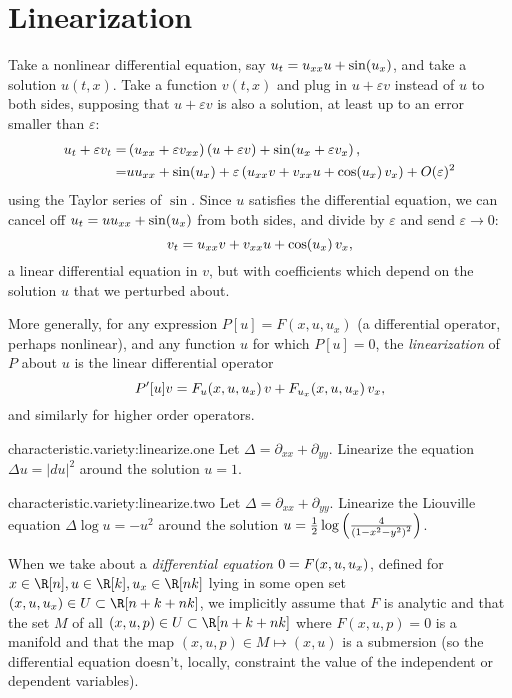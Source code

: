 \section{Linearization}
\begin{example}
Take a nonlinear differential equation, say \(u_t=u_{xx} u + \sin\!\left(u_x\right)\), and take a solution \(u(t,x)\).
Take a function \(v(t,x)\) and plug in \(u+\varepsilon v\) instead of \(u\) to both sides, supposing that \(u+\varepsilon v\) is also a solution, at least up to an error smaller than \(\varepsilon\):
\begin{align*}
u_t+\varepsilon v_t 
=& 
\left(u_{xx} + \varepsilon v_{xx}\right)(u+\varepsilon v) + \sin\!\left(u_x + \varepsilon v_x\right),
\\
=& 
u u_{xx} + \sin\!\left(u_x\right) + \varepsilon\left(u_{xx} v + v_{xx} u + \cos\!\left(u_x\right) v_x\right) + O(\varepsilon)^2
\end{align*}
using the Taylor series of \(\sin\).
Since \(u\) satisfies the differential equation, we can cancel off \(u_t=u u_{xx} + \sin\!\left(u_x\right)\) from both sides, and divide by \(\varepsilon\) and send \(\varepsilon \to 0\):
\[
v_t = u_{xx} v + v_{xx} u + \cos\!\left(u_x\right) v_x,
\]
a linear differential equation in \(v\), but with coefficients which depend on the solution \(u\) that we perturbed about.
\end{example}
More generally, for any expression \(P[u]=F(x,u,u_x)\) (a differential operator, perhaps nonlinear), and any function \(u\) for which \(P[u]=0\), the \emph{linearization} of \(P\) about \(u\) is the linear differential operator
\[
P'[u]v = F_u\!\left(x,u,u_x\right) v + F_{u_x}\!\left(x,u,u_x\right) v_x,
\]
and similarly for higher order operators.
\begin{problem}{characteristic.variety:linearize.one}
Let \(\Delta=\partial_{xx} + \partial_{yy}\).
Linearize the equation \(\Delta u=|du|^2\) around the solution \(u=1\).
\end{problem}
\begin{problem}{characteristic.variety:linearize.two}
Let \(\Delta=\partial_{xx} + \partial_{yy}\).
Linearize the Liouville equation \(\Delta \log u=-u^2\) around the solution \(u=\frac{1}{2}\log\left(\frac{4}{\left(1-x^2-y^2\right)^2}\right)\).
\end{problem}
When we take about a \emph{differential equation} \(0=F\!\left(x,u,u_x\right)\), defined for \(x \in \R[n], u \in \R[k], u_x \in \R[nk]\) lying in some open set \(\pr{x,u,u_x} \in U \subset \R[n+k+nk]\), we implicitly assume that \(F\) is analytic and that the set \(M\) of all \((x,u,p) \in U \subset \R[n+k+nk]\) where \(F(x,u,p)=0\) is a manifold and that the map \((x,u,p) \in M \mapsto (x,u)\) is a submersion (so the differential equation doesn't, locally, constraint the value of the independent or dependent variables).

